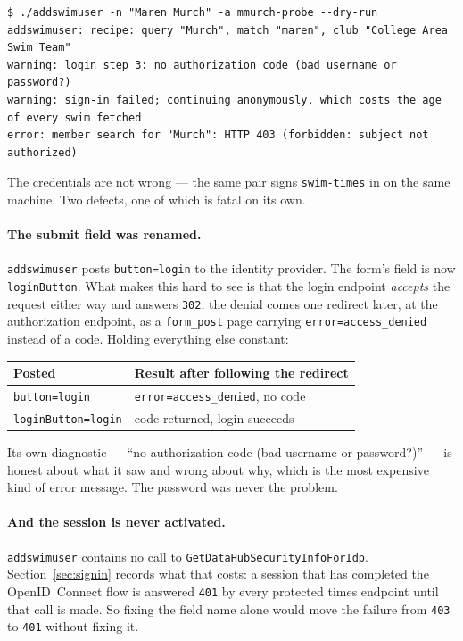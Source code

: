\documentclass[11pt]{article}
\newcommand{\code}[1]{\texttt{#1}}
\begin{document}
\begin{lstlisting}
$ ./addswimuser -n "Maren Murch" -a mmurch-probe --dry-run
addswimuser: recipe: query "Murch", match "maren", club "College Area Swim Team"
warning: login step 3: no authorization code (bad username or password?)
warning: sign-in failed; continuing anonymously, which costs the age of every swim fetched
error: member search for "Murch": HTTP 403 (forbidden: subject not authorized)
\end{lstlisting}

\noindent The credentials are not wrong --- the same pair signs
\code{swim-times} in on the same machine.  Two defects, one of which is
fatal on its own.

\paragraph{The submit field was renamed.}
\code{addswimuser} posts \code{button=login} to the identity provider.
The form's field is now \code{loginButton}.  What makes this hard to
see is that the login endpoint \emph{accepts} the request either way
and answers \code{302}; the denial comes one redirect later, at the
authorization endpoint, as a \code{form\_post} page carrying
\code{error=access\_denied} instead of a code.  Holding everything else
constant:

\begin{center}
\begin{tabular}{ll}
\toprule
\textbf{Posted} & \textbf{Result after following the redirect} \\
\midrule
\code{button=login}      & \textcolor{bad}{\code{error=access\_denied}, no code} \\
\code{loginButton=login} & \textcolor{good}{code returned, login succeeds} \\
\bottomrule
\end{tabular}
\end{center}

\noindent Its own diagnostic --- ``no authorization code (bad username
or password?)'' --- is honest about what it saw and wrong about why,
which is the most expensive kind of error message.  The password was
never the problem.

\paragraph{And the session is never activated.}
\code{addswimuser} contains no call to
\code{GetDataHubSecurityInfoForIdp}.  Section~\ref{sec:signin} records
what that costs: a session that has completed the OpenID~Connect flow
is answered \code{401} by every protected times endpoint until that
call is made.  So fixing the field name alone would move the failure
from \code{403} to \code{401} without fixing it.
\end{document}
